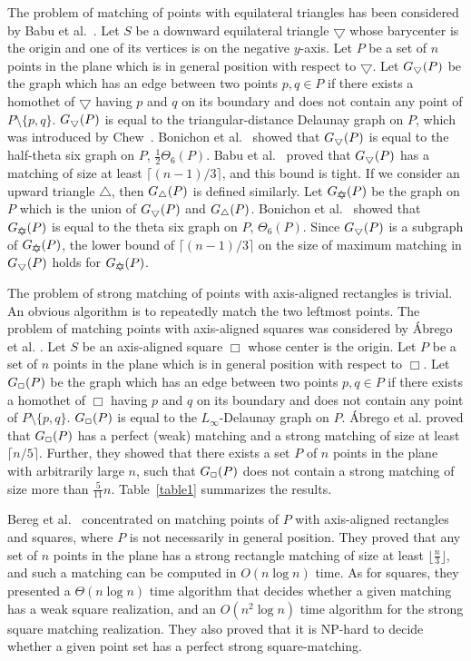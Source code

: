 \documentclass[11pt,a4paper]{article}
\newcommand{\G}[2]{G_{#1}({#2})}
\newcommand{\sqr}{\Box}
\newcommand{\sqrs}{\scriptsize\Box}
\newcommand{\trid}{\bigtriangledown}
\newcommand{\trids}{\scriptsize\bigtriangledown}
\newcommand{\triu}{\bigtriangleup}
\newcommand{\trius}{\scriptsize\bigtriangleup}
\newcommand{\GUD}{G_{\bigtriangledown \hspace*{-7.5pt} \bigtriangleup}}
\begin{document}
The problem of matching of points with equilateral triangles has been considered by Babu et al.~\cite{Babu2014}.
Let $S$ be a downward equilateral triangle $\trid$ whose barycenter is the origin and one of its vertices is on the negative $y$-axis. Let $P$ be a set of $n$ points in the plane which is in general position with respect to $\trid$. Let $\G{\trids}{P}$ be the graph which has an edge between two points $p,q\in P$ if there exists a homothet of $\trid$ having $p$ and $q$ on its boundary and does not contain any point of $P\setminus\{p,q\}$. $\G{\trids}{P}$ is equal to the triangular-distance Delaunay graph on $P$, which was introduced by Chew~\cite{Chew1989}. Bonichon et al.~\cite{Bonichon2010} showed that $\G{\trids}{P}$ is equal to the half-theta six graph on $P$, $\frac{1}{2}\Theta_6(P)$. Babu et al.~\cite{Babu2014} proved that $\G{\trids}{P}$ has a matching of size at least $\lceil(n-1)/3\rceil$, and this bound is tight. If we consider an upward triangle $\triu$, then $\G{\trius}{P}$ is defined similarly. Let $\GUD(P)$ be the graph on $P$ which is the union of $\G{\trids}{P}$ and $\G{\trius}{P}$. Bonichon et al.~\cite{Bonichon2010} showed that $\GUD(P)$ is equal to the theta six graph on $P$, $\Theta_6(P)$. Since $\G{\trids}{P}$ is a subgraph of $\GUD(P)$, the lower bound of $\lceil(n-1)/3\rceil$ on the size of maximum matching in $\G{\trids}{P}$ holds for $\GUD(P)$.  

The problem of strong matching of points with axis-aligned rectangles is trivial. An obvious algorithm is to repeatedly match the two leftmost points. The problem of matching points with axis-aligned squares was considered by \'{A}brego et al. \cite{Abrego2009}.
Let $S$ be an axis-aligned square $\sqr$ whose center is the origin. Let $P$ be a set of $n$ points in the plane which is in general position with respect to $\sqr$. Let $\G{\sqrs}{P}$ be the graph which has an edge between two points $p,q\in P$ if there exists a homothet of $\sqr$ having $p$ and $q$ on its boundary and does not contain any point of $P\setminus\{p,q\}$. $\G{\sqrs}{P}$ is equal to the $L_\infty$-Delaunay graph on $P$. \'{A}brego et al. \cite{Abrego2004, Abrego2009} proved that $\G{\sqrs}{P}$ has a perfect (weak) matching and a strong matching of size at least $\lceil n/5\rceil$. Further, they showed that there exists a set $P$ of $n$ points in the plane with arbitrarily large $n$, such that $\G{\sqrs}{P}$ does not contain a strong matching of size more than $\frac{5}{11}n$. Table~\ref{table1} summarizes the results.

Bereg et al.~\cite{Bereg2009} concentrated on matching points of $P$ with axis-aligned rectangles and squares, where $P$ is not necessarily in general position. 
They proved that any set of $n$ points in the plane has a strong rectangle matching of size at least $\lfloor\frac{n}{3}\rfloor$, and such a matching can be computed in $O(n \log n)$ time. As for squares, they presented a $\Theta(n\log n)$ time algorithm that decides whether a given matching has a weak square realization, 
and an $O(n^2\log n)$ time algorithm for the strong square matching realization. They also proved that it is NP-hard to decide whether a given point set has a perfect strong square-matching. 
\end{document}
